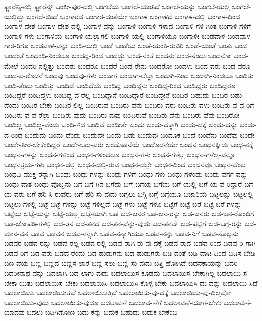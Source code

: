 {ಫ್ಲಾರೆನ್ಸಿ-ನಲ್ಲಿ
ಫ್ಲಾರೆನ್ಸ್
ಬಂಕೀ-ಪುರ-ದಲ್ಲಿ
ಬಂಗಲೆಯ
ಬಂಗಲೆ-ಯಂತಿದೆ
ಬಂಗಲೆ-ಯನ್ನು
ಬಂಗಲೆ-ಯಲ್ಲಿ
ಬಂಗಲೆ-ಯಲ್ಲಿದ್ದು
ಬಂಗಲೆ-ಯಿದೆ
ಬಂಗಾರದ
ಬಂಗಾರ-ದಂತೆಯೇ
ಬಂಗಾಳ
ಬಂಗಾಳದ
ಬಂಗಾಳ-ದಲ್ಲಿ
ಬಂಗಾಳ-ದಿಂದ
ಬಂಗಾಳ-ದೇಶ
ಬಂಗಾಳ-ದೇಶ-ದಲ್ಲಿ
ಬಂಗಾಳ-ವನ್ನು
ಬಂಗಾಳಿ
ಬಂಗಾಳಿ-ಗಳಾದ
ಬಂಗಾಳಿ-ಗಳಿ-ಗಿಂತ
ಬಂಗಾಳಿ-ಗಳಿಗೆ
ಬಂಗಾಳಿ-ಗಳು
ಬಂಗಾಳಿಯ
ಬಂಗಾಳಿ-ಯಲ್ಲಾಗಲಿ
ಬಂಗಾಳಿ-ಯಲ್ಲಿ
ಬಂಗಾಳಿಯೂ
ಬಂಗಾಳೀ
ಬಂಡವಾಳ
ಬಂಡವಾಳ-ಗಾರ-ರಿಗೂ
ಬಂಡವಾಳ-ವನ್ನು
ಬಂಡಿ-ಯಲ್ಲಿ
ಬಂಡೆ
ಬಂಡೆಯ
ಬಂಡೆ-ಯಂತಿ-ರುವಿರಿ
ಬಂಡೆ-ಯಂತೆ
ಬಂತು
ಬಂದ
ಬಂದಂತೆ
ಬಂದಂದಿ-ನಿಂದಲೂ
ಬಂದದ್ದ-ರಿಂದ
ಬಂದದ್ದು
ಬಂದ-ನಂತೆ
ಬಂದನು
ಬಂದ-ನೆಂದು
ಬಂದನೋ
ಬಂದ-ಮೇಲೆ
ಬಂದರಿ-ನಲ್ಲಿತ್ತು
ಬಂದರು
ಬಂದರೂ
ಬಂದರೆ
ಬಂದ-ರೇನು
ಬಂದರೋ
ಬಂದಳು
ಬಂದ-ವರು
ಬಂದ-ವರೂ
ಬಂದ-ವ-ರೊಡನೆ
ಬಂದವು
ಬಂದವು-ಗಳು
ಬಂದಾಗ
ಬಂದಾಗ-ಲೆಲ್ಲಾ
ಬಂದಾಗಿ-ನಿಂದ
ಬಂದಾಗಿ-ನಿಂದಲೂ
ಬಂದಿತು
ಬಂದಿ-ತೆಂದು
ಬಂದಿತ್ತು
ಬಂದಿದೆ
ಬಂದಿದೆಯೆ
ಬಂದಿದ್ದ
ಬಂದಿದ್ದನು
ಬಂದಿದ್ದ-ರಿಂದ
ಬಂದಿದ್ದರು
ಬಂದಿದ್ದರೂ
ಬಂದಿದ್ದರೆ
ಬಂದಿದ್ದಳು
ಬಂದಿದ್ದ-ವ-ರೆಲ್ಲ
ಬಂದಿದ್ದಾನೆ
ಬಂದಿದ್ದಾರೆ
ಬಂದಿದ್ದೇನೆ
ಬಂದಿರ-ಬಹುದು
ಬಂದಿರ-ಬಹು-ದೆಂದು
ಬಂದಿರ-ಬೇಕು
ಬಂದಿರ-ಲಿಲ್ಲ
ಬಂದಿರುವ
ಬಂದಿರು-ವನು
ಬಂದಿರು-ವರು
ಬಂದಿರು-ವಳು
ಬಂದಿರು-ವ-ವ-ರಿಗೆ
ಬಂದಿರು-ವ-ವ-ರೆಲ್ಲಾ
ಬಂದಿರು-ವುದು
ಬಂದಿರು-ವುವು
ಬಂದಿರುವೆ
ಬಂದಿರು-ವೆನು
ಬಂದಿರು-ವೆವು
ಬಂದಿರೋ
ಬಂದಿಲ್ಲ
ಬಂದಿಲ್ಲ-ವೆಂದು
ಬಂದಿ-ಳಿದ
ಬಂದಿವೆ
ಬಂದೀತೇ
ಬಂದು
ಬಂದು-ದಕ್ಕಾಗಿ
ಬಂದು-ದಕ್ಕೆ
ಬಂದು-ದನ್ನು
ಬಂದು-ದ-ರಿಂದ
ಬಂದುದು
ಬಂದು-ದೆಂದು
ಬಂದುದೇ
ಬಂದು-ಬಿಡು
ಬಂದುವು
ಬಂದೂಕ
ಬಂದೆ
ಬಂದೆನು
ಬಂದೆವು
ಬಂದೇ
ಬಂದೇ-ತೀರ-ಬೇಕೆಂದಿದ್ದರೆ
ಬಂದೇ-ಬರು-ವರು
ಬಂದೊಡನೆಯೆ
ಬಂದೊಡನೆಯೇ
ಬಂಧನ
ಬಂಧನಕ್ಕೀಡು
ಬಂಧ-ನಕ್ಕೆ
ಬಂಧನ-ಗಳನ್ನು
ಬಂಧನ-ಗಳಿಂದ
ಬಂಧನ-ಗಳಿಂದಲೂ
ಬಂಧನ-ಗಳು
ಬಂಧನ-ಗಳೆಲ್ಲ
ಬಂಧನ-ಗಳೆಲ್ಲ-ವನ್ನೂ
ಬಂಧನತ್ರಯ-ಗಳು
ಬಂಧನ-ದಲ್ಲಿ
ಬಂಧನ-ದಲ್ಲಿ-ರುವ
ಬಂಧನ-ದಲ್ಲೇ
ಬಂಧನ-ದಿಂದ
ಬಂಧನವೂ
ಬಂಧನ-ವೆಂಬ
ಬಂಧವಿ-ಮುಕ್ತ-ರನ್ನಾಗಿ
ಬಂಧು
ಬಂಧು-ಗಳನ್ನು
ಬಂಧು-ಗಳಿಗೆ
ಬಂಧು-ಗಳು
ಬಂಧು-ಗಳೆಂದು
ಬಂಧು-ವರ್ಗ-ವನ್ನು
ಬಂಧು-ವಾತ
ಬಂಧು-ವೊಬ್ಬನು
ಬಗೆ
ಬಗೆ-ಗಿನ
ಬಗೆದು
ಬಗೆ-ಬಗೆಯ
ಬಗೆಯ
ಬಗೆ-ಯಲ್ಲಿ
ಬಗೆ-ಯ-ವ-ರಿದ್ದಾರೆ
ಬಗೆ-ಯ-ವರು
ಬಗೆ-ಹರಿ-ಸಿ-ರುವರು
ಬಗೆ-ಹರಿ-ಸು-ವುದು
ಬಗ್ಗಲು
ಬಗ್ಗಿ
ಬಗ್ಗೆ
ಬಗ್ಗೆಯೂ
ಬಜಾರಿಯ
ಬಟ್ಟಲನ್ನು
ಬಟ್ಟಲಲ್ಲಿ
ಬಟ್ಟಲು-ಗಳಲ್ಲಿ
ಬಟ್ಟೆ
ಬಟ್ಟೆ-ಗಳನ್ನು
ಬಟ್ಟೆ-ಗಳಿಲ್ಲದೆ
ಬಟ್ಟೆ-ಗಳು
ಬಟ್ಟೆ-ಗಳೂ
ಬಟ್ಟೆಗೆ
ಬಟ್ಟೆ-ಬರೆ
ಬಟ್ಟೆ-ಬರೆ-ಗಳನ್ನು
ಬಟ್ಟೆಯ
ಬಟ್ಟೆ-ಯನ್ನು
ಬಟ್ಟೆ-ಯಲ್ಲ
ಬಟ್ಟೆ-ಯಾಗಿ
ಬಡ
ಬಡ-ಜನರ
ಬಡ-ಜನ-ರನ್ನು
ಬಡ-ಜನರು
ಬಡ-ಜನ-ರೊಂದಿಗೆ
ಬಡ-ಜೋಪಡಿ-ಗಳಲ್ಲಿ
ಬಡ-ತನ
ಬಡ-ತನದ
ಬಡ-ತನ-ವೆನ್ನು-ವುದು
ಬಡ-ತನವೇ
ಬಡ-ಪಟ್ಟಿಗೆ
ಬಡ-ಬಗ್ಗ-ರನ್ನು
ಬಡ-ಮಾನ-ವನ
ಬಡವ
ಬಡವನ
ಬಡವ-ನನ್ನಾಗಿ
ಬಡವ-ನನ್ನಾಗಿಯೂ
ಬಡವ-ನನ್ನು
ಬಡವ-ನಿಗೆ
ಬಡವ-ನೊಬ್ಬನು
ಬಡವರ
ಬಡವ-ರನ್ನು
ಬಡವ-ರಲ್ಲ
ಬಡವ-ರಲ್ಲಿ
ಬಡವ-ರಾಗಿ-ರು-ವು-ದಕ್ಕೆ
ಬಡವ-ರಾದ
ಬಡವ-ರಿಂದ
ಬಡವ-ರಿ-ಗಾಗಿ
ಬಡವ-ರಿಗೆ
ಬಡ-ವರು
ಬಡವ-ರೆಂದು
ಬಡ-ಹುಡುಗನು
ಬಡ-ಹುಡುಗರು
ಬಡಿ-ದಂತೆ
ಬಡಿ-ದಾಟ-ದಿಂದ
ಬಡಿಸ-ಬೇಡಿ
ಬಣ-ವೆಯ
ಬಣ್ಣ
ಬಣ್ಣದ
ಬಣ್ಣಿಸ-ಲಾರೆ
ಬಣ್ಣಿ-ಸಲು
ಬಣ್ಣಿ-ಸು-ವುದು
ಬತ್ತಿ-ಹೋಗಿದೆ
ಬದನೆಕಾಯನ್ನು
ಬದರಿ
ಬದರೀನಾಥ-ವನ್ನು
ಬದಲಾಗಿ
ಬದ-ಲಾಗು-ವುದು
ಬದಲಾಯಿಸ-ಕೂಡದು
ಬದಲಾಯಿಸ-ಬೇಕಾಗಿಲ್ಲ
ಬದಲಾಯಿ-ಸ-ಬೇಕಾ-ಯಿತು
ಬದಲಾಯಿಸ-ಬೇಕು
ಬದಲಾಯಿಸಿ
ಬದಲಾಯಿಸಿ-ಕೊಳ್ಳ-ಬೇಕು
ಬದಲಾಯಿಸಿ-ದು-ದನ್ನು
ಬದಲಾಯಿ-ಸಿದೆ
ಬದಲಾಯಿಸು
ಬದಲಾಯಿಸುತ್ತವೆ
ಬದಲಾಯಿಸುತ್ತಿದೆ
ಬದಲಾಯಿಸು-ವು-ದಕ್ಕೆ
ಬದಲಾಯಿಸು-ವು-ದಿಲ್ಲವೋ
ಬದಲಾಯಿಸು-ವುದು
ಬದಲಾಯಿಸು-ವುದೂ
ಬದಲಾವಣೆ
ಬದಲಾವ-ಣೆಗೆ
ಬದಲಾವಣೆ-ಯಾಗ-ಬೇಕು
ಬದಲಾವಣೆ-ಯಾದವು
ಬದಲು
ಬದಿಗಿಡೋಣ
ಬದು-ಕನ್ನು
ಬದುಕ-ಬಹುದು
ಬದುಕ-ಬೇಕೆಂಬ
}
